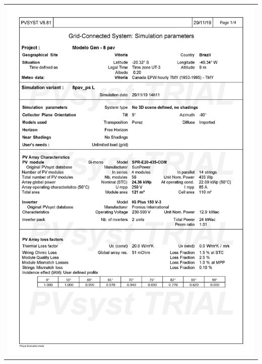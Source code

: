 \begin{table}[H]
    \centering
    \begin{tabular}{l}
        \includegraphics[width=\textwidth]{figures/attachments/resultpv15.jpg}
    \end{tabular}
\end{table}
\pagebreak
